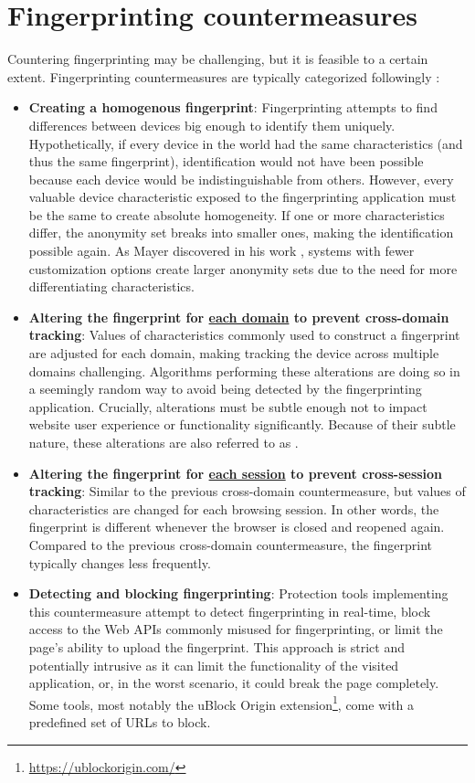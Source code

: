 \section{Fingerprinting countermeasures}
\label{Section:FingerprintingCounter}

Countering fingerprinting may be challenging, but it is feasible to a certain extent. Fingerprinting countermeasures are typically categorized followingly \cite{JShelterPaper, PriVaricator}:

\begin{itemize}
	\item \textbf{Creating a homogenous fingerprint}: Fingerprinting attempts to find differences between devices big enough to identify them uniquely. Hypothetically, if every device in the world had the same characteristics (and thus the same fingerprint), identification would not have been possible because each device would be indistinguishable from others. However, every valuable device characteristic exposed to the fingerprinting application must be the same to create absolute homogeneity. If one or more characteristics differ, the anonymity set breaks into smaller ones, making the identification possible again. As Mayer discovered in his work \cite{MayerAnyPerson}, systems with fewer customization options create larger anonymity sets due to the need for more differentiating characteristics.
	\item \textbf{Altering the fingerprint for \underline{each domain} to prevent cross-domain tracking}: Values of characteristics commonly used to construct a fingerprint are adjusted for each domain, making tracking the device across multiple domains challenging. Algorithms performing these alterations are doing so in a seemingly random way to avoid being detected by the fingerprinting application. Crucially, alterations must be subtle enough not to impact website user experience or functionality significantly. Because of their subtle nature, these alterations are also referred to as .
	\item \textbf{Altering the fingerprint for \underline{each session} to prevent cross-session tracking}: Similar to the previous cross-domain countermeasure, but values of characteristics are changed for each browsing session. In other words, the fingerprint is different whenever the browser is closed and reopened again. Compared to the previous cross-domain countermeasure, the fingerprint typically changes less frequently.
	\item \textbf{Detecting and blocking fingerprinting}: Protection tools implementing this countermeasure attempt to detect fingerprinting in real-time, block access to the Web APIs commonly misused for fingerprinting, or limit the page's ability to upload the fingerprint. This approach is strict and potentially intrusive as it can limit the functionality of the visited application, or, in the worst scenario, it could break the page completely. Some tools, most notably the uBlock Origin extension\footnote{\url{https://ublockorigin.com/}}, come with a predefined set of URLs to block.
\end{itemize}

